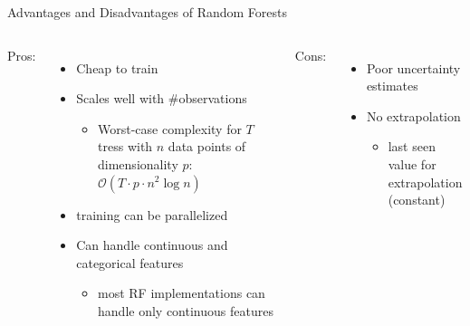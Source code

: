 \begin{frame}[c,fragile]{Advantages and Disadvantages of Random Forests}


\begin{columns}
Pros:
\begin{itemize}
  \item Cheap to train
  \item Scales well with \#observations
  \begin{itemize}
    \item Worst-case complexity for $T$ tress with $n$ data points of dimensionality $p$: $\mathcal O(T\cdot p \cdot n^2 \log{n})$
  \end{itemize}
  \item training can be parallelized
  \item Can handle continuous and categorical features
  \begin{itemize}
    \item most RF implementations can handle only continuous features
  \end{itemize}
\end{itemize}

Cons:
\begin{itemize}
  \item Poor uncertainty estimates
  \item No extrapolation
  \begin{itemize}
    \item last seen value for extrapolation (constant)
  \end{itemize}
\end{itemize}

\end{columns}

\end{frame}
